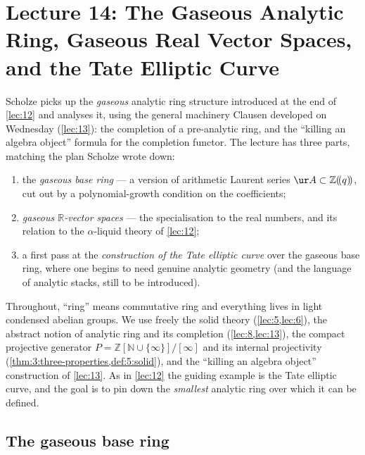 \section{Lecture 14: The Gaseous Analytic Ring, Gaseous Real Vector Spaces, and the Tate Elliptic Curve}
\label{lec:14}

Scholze picks up the \emph{gaseous} analytic ring structure introduced at the end
of \cref{lec:12} and analyses it, using the general machinery Clausen developed on
Wednesday (\cref{lec:13}): the completion of a pre-analytic ring, and the
``killing an algebra object'' formula for the completion functor. The lecture has
three parts, matching the plan Scholze wrote down:
\begin{enumerate}
\item the \emph{gaseous base ring} --- a version of arithmetic Laurent series
$\ur A\subset\mathbb{Z}(\!(q)\!)$, cut out by a polynomial-growth condition on the
coefficients;
\item \emph{gaseous $\mathbb{R}$-vector spaces} --- the specialisation to the real
numbers, and its relation to the $\alpha$-liquid theory of \cref{lec:12};
\item a first pass at the \emph{construction of the Tate elliptic curve} over the
gaseous base ring, where one begins to need genuine analytic geometry (and the
language of analytic stacks, still to be introduced).
\end{enumerate}

Throughout, ``ring'' means commutative ring and everything lives in light
condensed abelian groups. We use freely the solid theory
(\cref{lec:5,lec:6}), the abstract notion of analytic ring and its completion
(\cref{lec:8,lec:13}), the compact projective generator
$P=\mathbb{Z}[\mathbb{N}\cup\{\infty\}]/[\infty]$ and its internal projectivity
(\cref{thm:3:three-properties,def:5:solid}), and the ``killing an algebra object''
construction of \cref{lec:13}. As in \cref{lec:12} the guiding example is the Tate
elliptic curve, and the goal is to pin down the \emph{smallest} analytic ring over
which it can be defined.

\subsection{The gaseous base ring}

